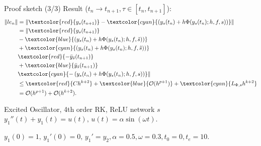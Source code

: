 \documentclass{beamer}
\begin{document}
\begin{frame}{Proof sketch (3/3)}
  Result ($t_{n} \to t_{n+1}, \tau \in [t_{n}, t_{n+1}]$):
  \begin{align*}
    \lVert le_{n} \rVert &= \lVert \textcolor{red}{y_{s}(t_{n+1})} - \textcolor{cyan}{(y_{s}(t_{n}) + h\Phi(y_{s}(t_{n}); h, f, s))} \rVert \\
    &= \lVert \textcolor{red}{y_{s}(t_{n+1})} \\
    &- \textcolor{blue}{\left( y_{s}(t_{n}) + h\Phi(y_{s}(t_{n}); h, f, \tilde{s})\right)}\\
    &+\textcolor{cyan}{\left( y_{s}(t_{n}) + h\Phi(y_{s}(t_{n}); h, f, \tilde{s})\right)}\\
    &\textcolor{red}{-\bar{y}_{\tilde{s}}(t_{n+1})}\\
    &+\textcolor{blue}{\bar{y}_{\tilde{s}}(t_{n+1})}\\
    &\textcolor{cyan}{-\left( y_{s}(t_{n}) + h\Phi(y_{s}(t_{n}); h, f, s)\right)} \rVert \\
    &\leq \textcolor{red}{Ch^{k+2}} + \textcolor{blue}{\mathcal{O}(h^{p+1})} + \textcolor{cyan}{L_{\Phi, s}h^{k+2}} \\
    &= \mathcal{O} (h^{p+1}) + \mathcal{O} (h^{k+2}).
  \end{align*}

\end{frame}


%  

\begin{frame}{Excited Oscillator, 4th order RK, ReLU network $s$}
  $y_{1}''(t) + y_{1}(t) = u(t),\, u(t) = \alpha\sin(\omega t)$.
  
  $y_{1}(0) = 1,\, y_{1}'(0) = 0,\, y_{1}' = y_{2}, \alpha = 0.5, \omega = 0.3, t_{0} = 0, t_{e} = 10$.
\end{frame}
\end{document}
